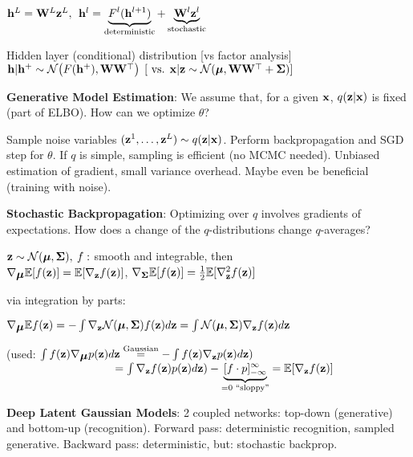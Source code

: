     \tab $\mathbf h^L=\mathbf W^L\mathbf z^L,\>\> \mathbf h^l=\underbrace{F^l(\mathbf h^{l+1})}_\text{deterministic}+\underbrace{\mathbf W^l\mathbf z^l}_\text{stochastic}$
    
    Hidden layer (conditional) distribution [vs factor analysis] \\
    \tab $\mathbf h|\mathbf h^+\sim\mathcal{N}\bigr(F(\mathbf h^+),\mathbf W\mathbf W^{\mathop{\mathrm{\top}}}  \bigr)\>\>\lbrack\text{ vs. } \mathbf x|\mathbf z\sim\mathcal{N}(\mbox{\boldmath $\mu$},\mathbf W\mathbf W^{\mathop{\mathrm{\top}}}+\mathbf \Sigma)  \rbrack$
    
    \textbf{Generative Model Estimation}: We assume that, for a given $\mathbf x$, $q(\mathbf z|\mathbf x)$ is fixed (part of ELBO). How can we optimize $\theta$?
    
    Sample noise variables $(\mathbf z^1,\ldots,\mathbf z^L)\sim q(\mathbf z|\mathbf x)$. Perform backpropagation and SGD step for $\theta$.
    If $q$ is simple, sampling is efficient (no MCMC needed). Unbiased estimation of gradient, small variance overhead. Maybe even be beneficial (training with noise).
    
    \textbf{Stochastic Backpropagation}: Optimizing over $q$ involves gradients of expectations. How does a change of the $q$-distributions change $q$-averages?
    
    \tab $\mathbf z\sim \mathcal{N}(\mbox{\boldmath $\mu$},\mathbf \Sigma),\> f:$ smooth and integrable, then\\
    \tab $\nabla_{\mbox{\boldmath $\mu$}} \mathbb E \lbrack f(\mathbf z) \rbrack = \mathbb E \lbrack \nabla_\mathbf z f(\mathbf z) \rbrack$, $\nabla_{\mathbf \Sigma} \mathbb E \lbrack f(\mathbf z) \rbrack=\frac{1}{2} \mathbb E \lbrack \nabla^2_{\mathbf z} f(\mathbf z) \rbrack$
    
    via integration by parts:
    
    \tab $\nabla_{\mbox{\boldmath $\mu$}} \mathbb E f(\mathbf z) = - \int \nabla_{\mathbf z} \mathcal{N} (\mbox{\boldmath $\mu$},\mathbf \Sigma)f(\mathbf z)d\mathbf z=\int\mathcal{N}(\mbox{\boldmath $\mu$},\mathbf \Sigma)\nabla_{\mathbf z}f(\mathbf z)d\mathbf z$
    
    \tab (used: $\int f(\mathbf z)\nabla_{\mbox{\boldmath $\mu$}}p(\mathbf z)d\mathbf z   \overset{\text{Gaussian}}{=}-\int f(\mathbf z) \nabla_{\mathbf z}p(\mathbf z)d\mathbf z) $\\
    \tab $\phantom{\text{(used: } f(\vz)\nabla_{\vmu}p(\vz)d\vz}= \int \nabla_{\vz}f(\vz) p(\vz)d\vz) - \underbrace{\lbrack f\cdot p \rbrack^\infty_{-\infty}}_{=0\text{ ``sloppy''}} = \E \lbrack \nabla_{\vz} f(\vz)\rbrack$
    
    \textbf{Deep Latent Gaussian Models}: 2 coupled networks: top-down (generative) and bottom-up (recognition). Forward pass: deterministic recognition, sampled generative. Backward pass: deterministic, but: stochastic backprop.
